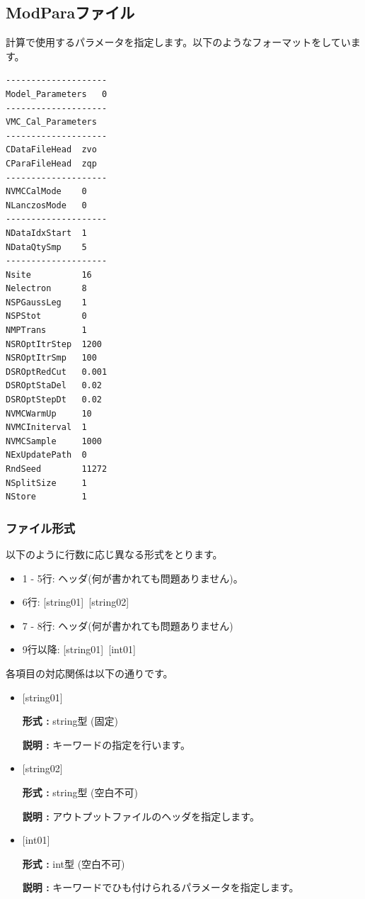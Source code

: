 \newpage
\subsection{ModParaファイル}
\label{Subsec:modpara}
計算で使用するパラメータを指定します。以下のようなフォーマットをしています。\\
\begin{minipage}{10cm}
\begin{screen}
\begin{verbatim}
--------------------
Model_Parameters   0
--------------------
VMC_Cal_Parameters
--------------------
CDataFileHead  zvo
CParaFileHead  zqp
--------------------
NVMCCalMode    0
NLanczosMode   0
--------------------
NDataIdxStart  1
NDataQtySmp    5
--------------------
Nsite          16
Nelectron      8
NSPGaussLeg    1
NSPStot        0
NMPTrans       1
NSROptItrStep  1200
NSROptItrSmp   100
DSROptRedCut   0.001
DSROptStaDel   0.02
DSROptStepDt   0.02
NVMCWarmUp     10
NVMCIniterval  1
NVMCSample     1000
NExUpdatePath  0
RndSeed        11272
NSplitSize     1
NStore         1  
\end{verbatim}
\end{screen}
\end{minipage}

\subsubsection{ファイル形式}
以下のように行数に応じ異なる形式をとります。
 \begin{itemize}
   \item  1 - 5行:  ヘッダ(何が書かれても問題ありません)。
   \item  6行:  [string01]~[string02]
   \item  7 - 8行: ヘッダ(何が書かれても問題ありません)
   \item  9行以降: [string01]~[int01]
  \end{itemize}
各項目の対応関係は以下の通りです。
\begin{itemize}
   \item  $[$string01$]$
   
   {\bf 形式 :} string型 (固定)

  {\bf 説明 :} キーワードの指定を行います。
   
   \item  $[$string02$]$
   
   {\bf 形式 :} string型 (空白不可)

  {\bf 説明 :} アウトプットファイルのヘッダを指定します。

   \item  $[$int01$]$
   
   {\bf 形式 :} int型 (空白不可)

  {\bf 説明 :} キーワードでひも付けられるパラメータを指定します。

  \end{itemize}

